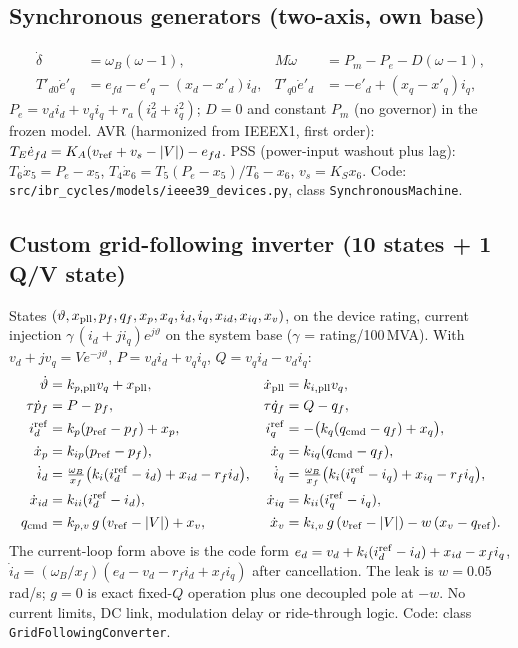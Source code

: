 \documentclass[10pt,a4paper]{article}
\theoremstyle{definition}
\begin{document}
\subsection{Synchronous generators (two-axis, own base)}
\begin{align}
\dot\delta&=\omega_B(\omega-1), & M\dot\omega&=P_m-P_e-D(\omega-1),\\
T'_{d0}\dot e'_q&=e_{fd}-e'_q-(x_d-x'_d)i_d, & T'_{q0}\dot e'_d&=-e'_d+(x_q-x'_q)i_q,
\end{align}
$P_e=v_di_d+v_qi_q+r_a(i_d^2+i_q^2)$; $D=0$ and constant $P_m$ (no governor) in the frozen model.
AVR (harmonized from IEEEX1, first order): $T_E\dot e_{fd}=K_A(v_{\rm ref}+v_s-|V|)-e_{fd}$.
PSS (power-input washout plus lag): $T_6\dot x_5=P_e-x_5$, $T_4\dot x_6=T_5(P_e-x_5)/T_6-x_6$, $v_s=K_Sx_6$.
Code: \nolinkurl{src/ibr_cycles/models/ieee39_devices.py}, class \texttt{SynchronousMachine}.

\subsection{Custom grid-following inverter (10 states + 1 Q/V state)}
States $(\vartheta,x_{\rm pll},p_f,q_f,x_p,x_q,i_d,i_q,x_{id},x_{iq},x_v)$, on the device rating,
current injection $\gamma\,(i_d+ji_q)e^{j\vartheta}$ on the system base ($\gamma$ = rating/100\,MVA).
With $v_d+jv_q=Ve^{-j\vartheta}$, $P=v_di_d+v_qi_q$, $Q=v_qi_d-v_di_q$:
\begin{align}
\dot\vartheta&=k_{p,\rm pll}v_q+x_{\rm pll}, & \dot x_{\rm pll}&=k_{i,\rm pll}v_q,\\
\tau\dot p_f&=P-p_f, & \tau\dot q_f&=Q-q_f,\\
i_d^{\rm ref}&=k_p(p_{\rm ref}-p_f)+x_p, & i_q^{\rm ref}&=-\big(k_q(q_{\rm cmd}-q_f)+x_q\big),\\
\dot x_p&=k_{ip}(p_{\rm ref}-p_f), & \dot x_q&=k_{iq}(q_{\rm cmd}-q_f),\\
\dot i_d&=\tfrac{\omega_B}{x_f}\big(k_i(i_d^{\rm ref}-i_d)+x_{id}-r_fi_d\big), &
\dot i_q&=\tfrac{\omega_B}{x_f}\big(k_i(i_q^{\rm ref}-i_q)+x_{iq}-r_fi_q\big),\\
\dot x_{id}&=k_{ii}(i_d^{\rm ref}-i_d), & \dot x_{iq}&=k_{ii}(i_q^{\rm ref}-i_q),\\
q_{\rm cmd}&=k_{p,v}\,g\,(v_{\rm ref}-|V|)+x_v, & \dot x_v&=k_{i,v}\,g\,(v_{\rm ref}-|V|)-w\,(x_v-q_{\rm ref}).
\end{align}
The current-loop form above is the code form $e_{d}=v_d+k_i(i_d^{\rm ref}-i_d)+x_{id}-x_fi_q$,
$\dot i_d=(\omega_B/x_f)(e_d-v_d-r_fi_d+x_fi_q)$ after cancellation. The leak is $w=0.05$\,rad/s;
$g=0$ is exact fixed-$Q$ operation plus one decoupled pole at $-w$. No current limits, DC link,
modulation delay or ride-through logic. Code: class \texttt{GridFollowingConverter}.
\end{document}

